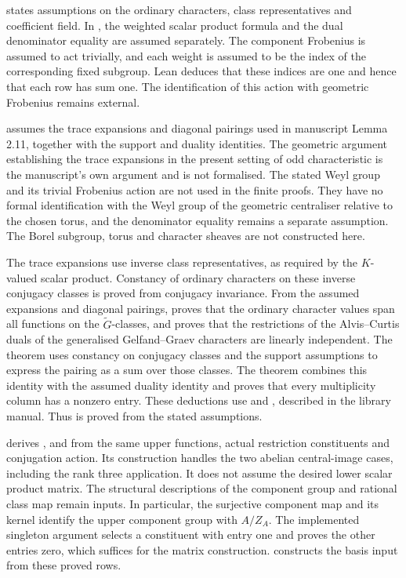 \begin{implementation}
 states assumptions on the
ordinary characters, class representatives and coefficient field.
In , the weighted scalar product formula and the
dual denominator equality are assumed separately. The component
Frobenius is assumed to act trivially, and each weight is assumed to
be the index of the corresponding fixed subgroup. Lean deduces that these
indices are one and hence that each row has sum one. The identification
of this action with geometric Frobenius remains external.

 assumes the trace expansions and diagonal
pairings used in manuscript Lemma 2.11, together with the support and
duality identities. The geometric argument establishing the trace
expansions in the present setting of odd characteristic is the manuscript's
own argument and is not formalised. The stated Weyl group and its
trivial Frobenius action are not used in the finite proofs. They have
no formal identification with the Weyl group of the geometric
centraliser relative to the chosen torus, and the denominator
equality remains a separate assumption. The Borel subgroup, torus and
character sheaves are not constructed here.

The trace expansions use inverse class representatives, as required
by the $K$-valued scalar product. Constancy of ordinary characters on
these inverse conjugacy classes is proved from conjugacy invariance.
From the assumed expansions and diagonal pairings,
 proves that the ordinary
character values span all functions on the $\widetilde G$-classes, and
 proves that the restrictions of the Alvis--Curtis duals of the generalised
Gelfand--Graev characters are linearly independent. The theorem 
uses constancy on conjugacy classes and the support assumptions to
express the pairing as a sum over those classes. The theorem
 combines this identity with the assumed duality
identity and proves that every multiplicity column has a nonzero entry. These deductions
use  and
, described in the
library manual. Thus  is proved
from the stated assumptions.

 derives
,  and
 from the same upper functions, actual restriction
constituents and conjugation action. Its  construction
handles the two abelian central-image cases, including the rank three
application. It does not assume the desired lower scalar product matrix.
The structural descriptions of the component group and rational class
map remain inputs. In particular, the surjective component map and its
kernel identify the upper component group with $A/Z_A$.
The implemented singleton argument selects a constituent with entry
one and proves the other entries zero, which suffices for the matrix
construction.  constructs the basis
input  from these proved rows.


\end{implementation}
